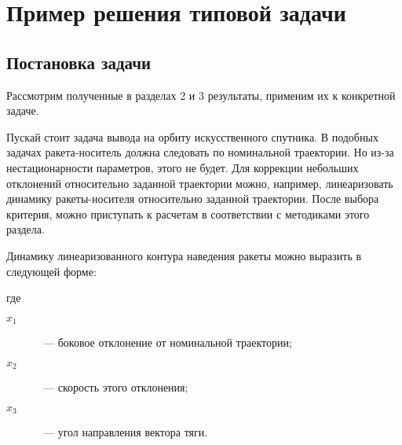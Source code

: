 


\chapter{Пример решения типовой задачи}
\renewcommand{\optU}{  \optimum{\m{u}} } %
\renewcommand{\funcF}{ \calf{F}        } %



\section{Постановка задачи}



Рассмотрим полученные в разделах 2 и 3 результаты, применим их к конкретной задаче.

Пускай стоит задача вывода на орбиту искусственного спутника. В подобных задачах ракета-носитель должна следовать по номинальной траектории. Но из-за нестационарности параметров, этого не будет. Для коррекции небольших отклонений относительно заданной траектории можно, например, линеаризовать динамику ракеты-носителя относительно заданной траектории. После выбора критерия, можно приступать к расчетам в соответствии с методиками этого раздела.

Динамику линеаризованного контура наведения ракеты можно выразить в следующей форме:

\eeq

где

\begin{description}
	\item[$x_1$]~--- боковое отклонение от номинальной траектории;
	\item[$x_2$]~--- скорость этого отклонения;
	\item[$x_3$]~--- угол направления вектора тяги.
\end{description}

